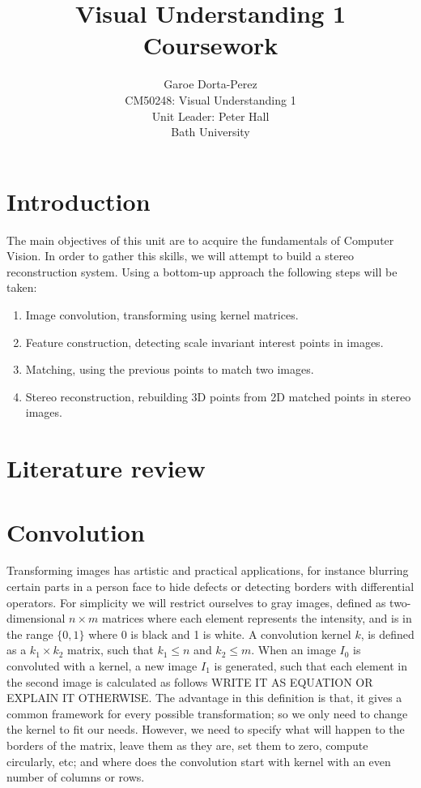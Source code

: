 \documentclass[12pt]{article}
\begin{document}
  
\title{Visual Understanding 1 Coursework}
\author{Garoe Dorta-Perez\\
CM50248: Visual Understanding 1\\
Unit Leader: Peter Hall\\
Bath University}
 
\maketitle
 
\section{Introduction}

The main objectives of this unit are to acquire the fundamentals of Computer Vision.
In order to gather this skills, we will attempt to build a stereo reconstruction system.
Using a bottom-up approach the following steps will be taken:
\begin{enumerate}
\item Image convolution, transforming using kernel matrices.
\item Feature construction, detecting scale invariant interest points in images.
\item Matching, using the previous points to match two images.
\item Stereo reconstruction, rebuilding 3D points from 2D matched points in stereo images.
\end{enumerate}

\section{Literature review}


\section{Convolution}
\label{sec:convolution}

Transforming images has artistic and practical applications, for instance blurring certain parts in a person face to hide defects or detecting borders with differential operators.
For simplicity we will restrict ourselves to gray images, defined as two-dimensional $n \times m$ matrices where each element represents the intensity, and is in the range $\lbrace  0, 1 \rbrace$ where 0 is black and 1 is white.
A convolution kernel $k$, is defined as a $k_1 \times k_2$ matrix, such that $k_1 \leqslant n$ and $k_2 \leqslant m$.
When an image $I_0$ is convoluted with a kernel, a new image $I_1$ is generated, such that each element in the second image is calculated as follows WRITE IT AS EQUATION OR EXPLAIN IT OTHERWISE.
The advantage in this definition is that, it gives a common framework for every possible transformation; so we only need to change the kernel to fit our needs.
However, we need to specify what will happen to the borders of the matrix, leave them as they are, set them to zero, compute circularly, etc; and where does the convolution start with kernel with an even number of columns or rows.
\end{document}

